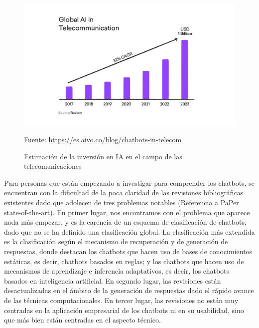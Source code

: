 \begin{figure}[h]
    \centering
    \includegraphics[width=1.0\textwidth]{imagenes/01_Introduccion/inversion_chatbots.jpg}
    \begin{center}
        Fuente: \url{https://es.aivo.co/blog/chatbots-in-telecom}
    \end{center}
    \caption{Estimación de la inversión en IA en el campo de las telecomunicaciones}
    \label{fig:inversion_chatbot}
\end{figure}

Para personas que están empezando a investigar para comprender los chatbots, se encuentran con la dificultad de la poca claridad de las revisiones bibliográficas existentes dado que adolecen de tres problemas notables (Referencia a PaPer state-of-the-art). En primer lugar, nos encontramos con el problema que aparece nada más empezar, y es la carencia de un esquema de clasificación de chatbots, dado que no se ha definido una clasificación global. La clasificación más extendida es la clasificación según el mecanismo de recuperación y de generación de respuestas, donde destacan los chatbots que hacen uso de bases de conocimientos estáticas, es decir, chatbots basados en reglas; y los chatbots que hacen uso de mecanismos de aprendizaje e inferencia adaptativos, es decir, los chatbots basados en inteligencia artificial. En segundo lugar, las revisiones están desactualizadas en el ámbito de la generación de respuestas dado el rápido avance de las técnicas computacionales. En tercer lugar, las revisiones no están muy centradas en la aplicación empresarial de los chatbots ni en su usabilidad, sino que más bien están centradas en el aspecto técnico.

